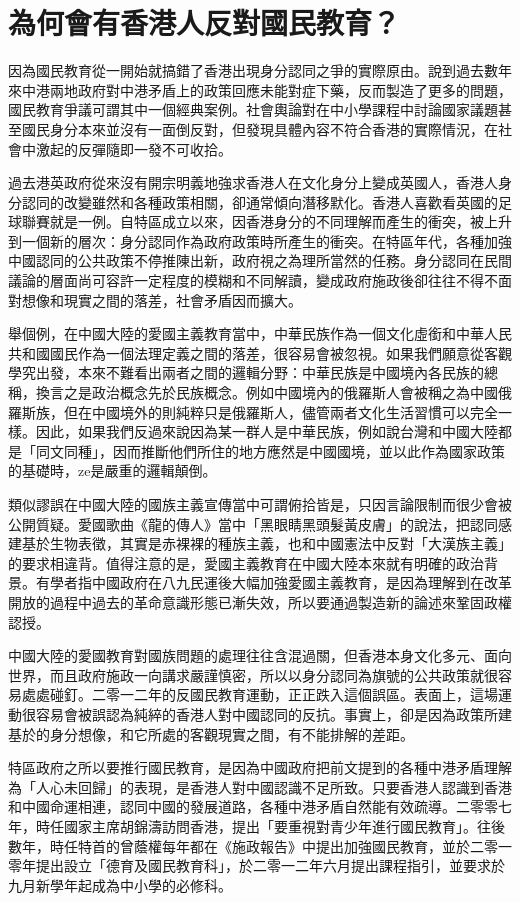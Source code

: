 \section{為何會有香港人反對國民教育？}
\label{sec:sec12}

因為國民教育從一開始就搞錯了香港出現身分認同之爭的實際原由。說到過去數年來中港兩地政府對中港矛盾上的政策回應未能對症下藥，反而製造了更多的問題，國民教育爭議可謂其中一個經典案例。社會輿論對在中小學課程中討論國家議題甚至國民身分本來並沒有一面倒反對，但發現具體內容不符合香港的實際情況，在社會中激起的反彈隨即一發不可收拾。

過去港英政府從來沒有開宗明義地強求香港人在文化身分上變成英國人，香港人身分認同的改變雖然和各種政策相關，卻通常傾向潛移默化。香港人喜歡看英國的足球聯賽就是一例。自特區成立以來，因香港身分的不同理解而產生的衝突，被上升到一個新的層次：身分認同作為政府政策時所產生的衝突。在特區年代，各種加強中國認同的公共政策不停推陳出新，政府視之為理所當然的任務。身分認同在民間議論的層面尚可容許一定程度的模糊和不同解讀，變成政府施政後卻往往不得不面對想像和現實之間的落差，社會矛盾因而擴大。

舉個例，在中國大陸的愛國主義教育當中，中華民族作為一個文化虛銜和中華人民共和國國民作為一個法理定義之間的落差，很容易會被忽視。如果我們願意從客觀學究出發，本來不難看出兩者之間的邏輯分野：中華民族是中國境內各民族的總稱，換言之是政治概念先於民族概念。例如中國境內的俄羅斯人會被稱之為中國俄羅斯族，但在中國境外的則純粹只是俄羅斯人，儘管兩者文化生活習慣可以完全一樣。因此，如果我們反過來說因為某一群人是中華民族，例如說台灣和中國大陸都是「同文同種」，因而推斷他們所住的地方應然是中國國境，並以此作為國家政策的基礎時，ze是嚴重的邏輯顛倒。

類似謬誤在中國大陸的國族主義宣傳當中可謂俯拾皆是，只因言論限制而很少會被公開質疑。愛國歌曲《龍的傳人》當中「黑眼睛黑頭髮黃皮膚」的說法，把認同感建基於生物表徵，其實是赤裸裸的種族主義，也和中國憲法中反對「大漢族主義」的要求相違背。值得注意的是，愛國主義教育在中國大陸本來就有明確的政治背景。有學者指中國政府在八九民運後大幅加強愛國主義教育，是因為理解到在改革開放的過程中過去的革命意識形態已漸失效，所以要通過製造新的論述來鞏固政權認授。

中國大陸的愛國教育對國族問題的處理往往含混過關，但香港本身文化多元、面向世界，而且政府施政一向講求嚴謹慎密，所以以身分認同為旗號的公共政策就很容易處處碰釘。二零一二年的反國民教育運動，正正跌入這個誤區。表面上，這場運動很容易會被誤認為純綷的香港人對中國認同的反抗。事實上，卻是因為政策所建基於的身分想像，和它所處的客觀現實之間，有不能排解的差距。

特區政府之所以要推行國民教育，是因為中國政府把前文提到的各種中港矛盾理解為「人心未回歸」的表現，是香港人對中國認識不足所致。只要香港人認識到香港和中國命運相連，認同中國的發展道路，各種中港矛盾自然能有效疏導。二零零七年，時任國家主席胡錦濤訪問香港，提出「要重視對青少年進行國民教育」。往後數年，時任特首的曾蔭權每年都在《施政報告》中提出加強國民教育，並於二零一零年提出設立「德育及國民教育科」，於二零一二年六月提出課程指引，並要求於九月新學年起成為中小學的必修科。

